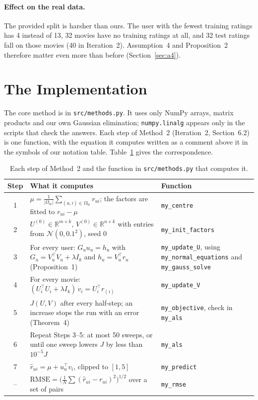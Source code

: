 \documentclass[11pt]{article}
\theoremstyle{definition}
\newcommand{\R}{\mathbb{R}}
\newcommand{\T}{^{\top}}
\newcommand{\code}[1]{\texttt{#1}}
\begin{document}
\paragraph{Effect on the real data.} The provided split is harsher than ours. The user with the
fewest training ratings has 4 instead of 13, 32 movies have no training ratings at all, and 32
test ratings fall on those movies (40 in Iteration~2). Assumption~4 and Proposition~2 therefore
matter even more than before (Section~\ref{sec:a4}).

\section{The Implementation}
\label{sec:impl}

The core method is in \code{src/methods.py}. It uses only NumPy arrays, matrix products and our
own Gaussian elimination; \code{numpy.linalg} appears only in the scripts that check the answers.
Each step of Method~2 (Iteration~2, Section~6.2) is one function, with the equation it computes
written as a comment above it in the symbols of our notation table. Table~\ref{tab:steps} gives
the correspondence.

\begin{table}[htbp]
\centering
\small
\begin{tabular}{@{}c>{\raggedright}p{8.6cm}>{\raggedright\arraybackslash}p{4.6cm}@{}}
\toprule
Step & What it computes & Function \\
\midrule
1 & $\mu = \frac{1}{|\Omega_{\mathrm{tr}}|}\sum_{(u,i)\in\Omega_{\mathrm{tr}}} r_{ui}$;
    the factors are fitted to $r_{ui} - \mu$ & \code{my\_centre} \\
2 & $U^{(0)} \in \R^{m\times k}$, $V^{(0)} \in \R^{n\times k}$ with entries from
    $\mathcal N(0, 0.1^2)$, seed 0 & \code{my\_init\_factors} \\
3 & For every user: $G_u u_u = h_u$ with $G_u = V_u\T V_u + \lambda I_k$ and
    $h_u = V_u\T r_u$ (Proposition~1) & \code{my\_update\_U}, using
    \code{my\_normal\_equations} and \code{my\_gauss\_solve} \\
4 & For every movie: $(U_i\T U_i + \lambda I_k)\, v_i = U_i\T r_{(i)}$ & \code{my\_update\_V} \\
5 & $J(U,V)$ after every half-step; an increase stops the run with an error (Theorem~4)
  & \code{my\_objective}, check in \code{my\_als} \\
6 & Repeat Steps 3--5: at most 50 sweeps, or until one sweep lowers $J$ by less than $10^{-5}J$
  & \code{my\_als} \\
7 & $\hat r_{ui} = \mu + u_u\T v_i$, clipped to $[1,5]$ & \code{my\_predict} \\
-- & $\mathrm{RMSE} = \bigl(\frac1N \sum (\hat r_{ui} - r_{ui})^2\bigr)^{1/2}$ over a set of
    pairs & \code{my\_rmse} \\
\bottomrule
\end{tabular}
\caption{Each step of Method~2 and the function in \code{src/methods.py} that computes it.}
\label{tab:steps}
\end{table}
\end{document}
